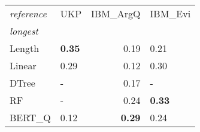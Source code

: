 \begin{tabular}{llrl}
\toprule
\textit{reference} &   UKP &  IBM\_ArgQ & IBM\_Evi \\
\textit{longest}  &       &           &         \\
\midrule
Length &  \textbf{0.35} &      0.19 &    0.21 \\
Linear &  0.29 &      0.12 &     0.30 \\
DTree  &     - &      0.17 &       - \\
RF     &     - &      0.24 &    \textbf{0.33} \\
BERT\_Q &  0.12 &      \textbf{0.29} &    0.24 \\
\bottomrule
\end{tabular}
